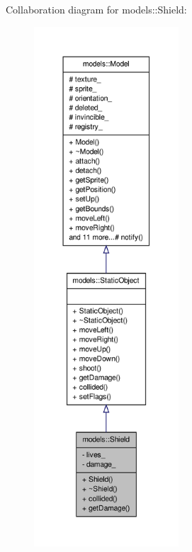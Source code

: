 \-Collaboration diagram for models\-:\-:\-Shield\-:
\nopagebreak
\begin{figure}[H]
\begin{center}
\leavevmode
\includegraphics[height=550pt]{da/d83/classmodels_1_1Shield__coll__graph}
\end{center}
\end{figure}

